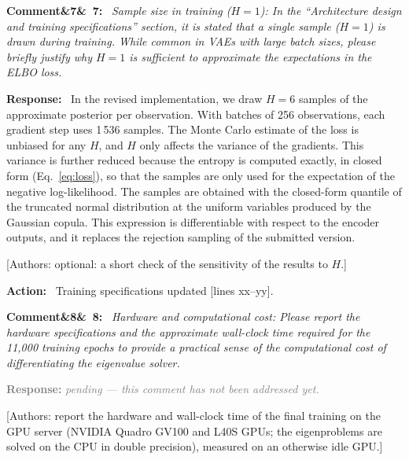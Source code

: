 \documentclass[11pt]{article}
\newenvironment{rcomment}[1]{\par\bigskip\noindent\textbf{Comment\ifx&#1&\else\ #1\fi:}\ \itshape}{\par}
\newenvironment{response}{\par\smallskip\noindent\color{resp}\textbf{Response:}\ }{\par}
\newenvironment{action}{\par\smallskip\noindent\color{resp}\textbf{Action:}\ }{\par}
\newcommand{\pending}{\par\smallskip\noindent\textcolor{gray}{\textbf{Response:} \textit{pending --- this comment
has not been addressed yet.}}\par}
\newcommand{\authornote}[1]{\textcolor{note}{\textsf{[Authors: #1]}}}
\newcommand{\tbd}[1]{\textcolor{note}{\textsf{[#1]}}}
\newcommand{\lines}[1]{\tbd{lines #1}}
\begin{document}
\begin{rcomment}{7}
Sample size in training ($H=1$): In the ``Architecture design and training specifications'' section, it is stated that
a single sample ($H=1$) is drawn during training. While common in VAEs with large batch sizes, please briefly justify why
$H=1$ is sufficient to approximate the expectations in the ELBO loss.
\end{rcomment}

\begin{response}
In the revised implementation, we draw $H=6$ samples of the approximate posterior per observation. With batches of 256
observations, each gradient step uses 1\,536 samples. The Monte Carlo estimate of the loss is unbiased for any $H$, and
$H$ only affects the variance of the gradients. This variance is further reduced because the entropy is computed
exactly, in closed form (Eq.~\eqref{eq:loss}), so that the samples are only used for the expectation of the negative
log-likelihood. The samples are obtained with the closed-form quantile of the truncated normal distribution at the uniform
variables produced by the Gaussian copula. This expression is differentiable with respect to the encoder outputs, and it
replaces the rejection sampling of the submitted version.
\end{response}
\authornote{optional: a short check of the sensitivity of the results to $H$.}

\begin{action}
Training specifications updated \lines{xx--yy}.
\end{action}

\begin{rcomment}{8}
Hardware and computational cost: Please report the hardware specifications and the approximate wall-clock time
required for the 11,000 training epochs to provide a practical sense of the computational cost of differentiating the
eigenvalue solver.
\end{rcomment}
\pending
\authornote{report the hardware and wall-clock time of the final training on the GPU server (NVIDIA Quadro GV100 and L40S GPUs; the eigenproblems are solved on the CPU in double precision), measured on an otherwise idle GPU.}
\end{document}

